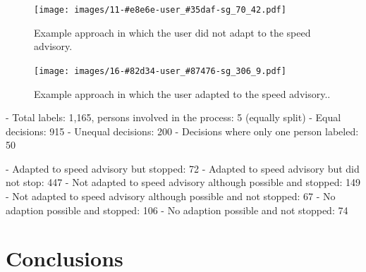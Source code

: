 \begin{figure}[t]
\caption{Example approach in which the user did not adapt to the speed advisory.}\label{fig:example-trajectory-not-adapted}
\texttt{[image: images/11-\#e8e6e-user\_\#35daf-sg\_70\_42.pdf]}
\end{figure}

\begin{figure}[t]
\caption{Example approach in which the user adapted to the speed advisory..}\label{fig:example-trajectory-adapted}
\texttt{[image: images/16-\#82d34-user\_\#87476-sg\_306\_9.pdf]}
\end{figure}

- Total labels: 1,165, persons involved in the process: 5 (equally split)
- Equal decisions: 915
- Unequal decisions: 200
- Decisions where only one person labeled: 50

- Adapted to speed advisory but stopped: 72
- Adapted to speed advisory but did not stop: 447
- Not adapted to speed advisory although possible and stopped: 149
- Not adapted to speed advisory although possible and not stopped: 67
- No adaption possible and stopped: 106
- No adaption possible and not stopped: 74

\section{Conclusions}
